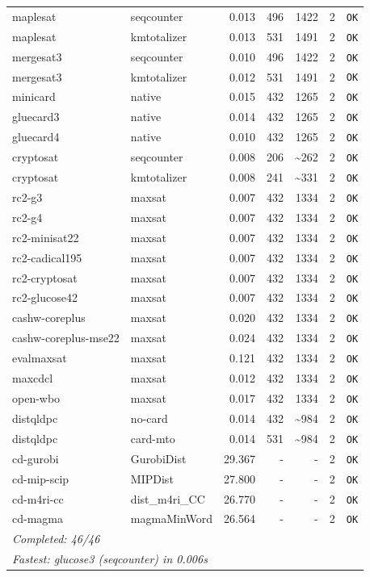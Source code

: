 \begin{longtable}{llrrrl p{}}
maplesat & seqcounter & 0.013 & 496 & 1422 & 2 & \texttt{OK} \\
maplesat & kmtotalizer & 0.013 & 531 & 1491 & 2 & \texttt{OK} \\
mergesat3 & seqcounter & 0.010 & 496 & 1422 & 2 & \texttt{OK} \\
mergesat3 & kmtotalizer & 0.012 & 531 & 1491 & 2 & \texttt{OK} \\
minicard & native & 0.015 & 432 & 1265 & 2 & \texttt{OK} \\
gluecard3 & native & 0.014 & 432 & 1265 & 2 & \texttt{OK} \\
gluecard4 & native & 0.010 & 432 & 1265 & 2 & \texttt{OK} \\
cryptosat & seqcounter & 0.008 & 206 & \textasciitilde{}262 & 2 & \texttt{OK} \\
cryptosat & kmtotalizer & 0.008 & 241 & \textasciitilde{}331 & 2 & \texttt{OK} \\
rc2-g3 & maxsat & 0.007 & 432 & 1334 & 2 & \texttt{OK} \\
rc2-g4 & maxsat & 0.007 & 432 & 1334 & 2 & \texttt{OK} \\
rc2-minisat22 & maxsat & 0.007 & 432 & 1334 & 2 & \texttt{OK} \\
rc2-cadical195 & maxsat & 0.007 & 432 & 1334 & 2 & \texttt{OK} \\
rc2-cryptosat & maxsat & 0.007 & 432 & 1334 & 2 & \texttt{OK} \\
rc2-glucose42 & maxsat & 0.007 & 432 & 1334 & 2 & \texttt{OK} \\
cashw-coreplus & maxsat & 0.020 & 432 & 1334 & 2 & \texttt{OK} \\
cashw-coreplus-mse22 & maxsat & 0.024 & 432 & 1334 & 2 & \texttt{OK} \\
evalmaxsat & maxsat & 0.121 & 432 & 1334 & 2 & \texttt{OK} \\
maxcdcl & maxsat & 0.012 & 432 & 1334 & 2 & \texttt{OK} \\
open-wbo & maxsat & 0.017 & 432 & 1334 & 2 & \texttt{OK} \\
distqldpc & no-card & 0.014 & 432 & \textasciitilde{}984 & 2 & \texttt{OK} \\
distqldpc & card-mto & 0.014 & 531 & \textasciitilde{}984 & 2 & \texttt{OK} \\
cd-gurobi & GurobiDist & 29.367 & - & - & 2 & \texttt{OK} \\
cd-mip-scip & MIPDist & 27.800 & - & - & 2 & \texttt{OK} \\
cd-m4ri-cc & dist\_m4ri\_CC & 26.770 & - & - & 2 & \texttt{OK} \\
cd-magma & magmaMinWord & 26.564 & - & - & 2 & \texttt{OK} \\
\midrule
\multicolumn{7}{l}{\textit{Completed: 46/46}} \\
\multicolumn{7}{l}{\textit{Fastest: glucose3 (seqcounter) in 0.006s}} \\
\end{longtable}

